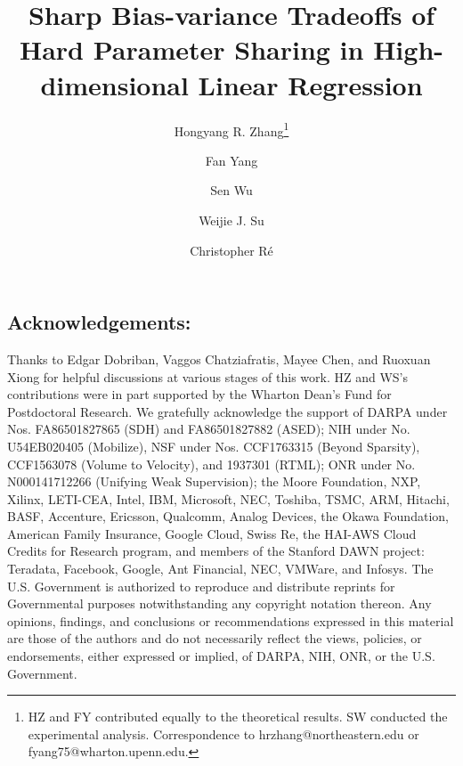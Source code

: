 \documentclass{article}
\newcommand*\samethanks[1][\value{footnote}]{\footnotemark[#1]}
\begin{document}
\title{\textbf{Sharp Bias-variance Tradeoffs of Hard Parameter Sharing in High-dimensional Linear Regression}}
\vspace{0.15in}
\author[1]{Hongyang R. Zhang\thanks{HZ and FY contributed equally to the theoretical results. SW conducted the experimental analysis. Correspondence to hrzhang@northeastern.edu or fyang75@wharton.upenn.edu.}}
\author[2]{Fan Yang\samethanks}
\author[3]{Sen Wu\samethanks}
\author[2]{Weijie J. Su}
\author[3]{Christopher R\'e}
\vspace{0.15in}



\maketitle









\subsection*{Acknowledgements:}
Thanks to Edgar Dobriban, Vaggos Chatziafratis, Mayee Chen, and Ruoxuan Xiong for helpful discussions at various stages of this work.
HZ and WS's contributions were in part supported by the Wharton Dean's Fund for Postdoctoral Research.
We gratefully acknowledge the support of DARPA under Nos. FA86501827865 (SDH) and FA86501827882 (ASED); NIH under No. U54EB020405 (Mobilize), NSF under Nos. CCF1763315 (Beyond Sparsity), CCF1563078 (Volume to Velocity), and 1937301 (RTML); ONR under No. N000141712266 (Unifying Weak Supervision); the Moore Foundation, NXP, Xilinx, LETI-CEA, Intel, IBM, Microsoft, NEC, Toshiba, TSMC, ARM, Hitachi, BASF, Accenture, Ericsson, Qualcomm, Analog Devices, the Okawa Foundation, American Family Insurance, Google Cloud, Swiss Re, the HAI-AWS Cloud Credits for Research program, and members of the Stanford DAWN project: Teradata, Facebook, Google, Ant Financial, NEC, VMWare, and Infosys. The U.S. Government is authorized to reproduce and distribute reprints for Governmental purposes notwithstanding any copyright notation thereon. Any opinions, findings, and conclusions or recommendations expressed in this material are those of the authors and do not necessarily reflect the views, policies, or endorsements, either expressed or implied, of DARPA, NIH, ONR, or the U.S. Government.




\appendix







\end{document}

